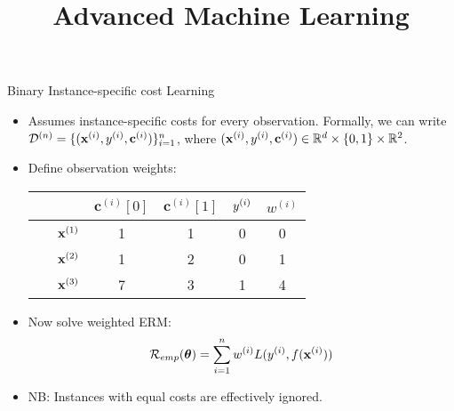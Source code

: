 \documentclass[11pt,compress,t,notes=noshow, xcolor=table]{beamer}
\title{Advanced Machine Learning}
\date{}
\newcommand{\cv}{\mathbf{c}}    %
\begin{document}



\sloppy





\begin{vbframe}{Binary Instance-specific cost Learning}
    \footnotesize
    \begin{itemize}
        \footnotesize
        \item Assumes instance-specific costs for every observation. Formally, we can write $\D^{(n)} = \{(\xi, \yi, \cv^{(i)})\}_{i=1}^n$, where $(\xi, \yi, \cv^{(i)}) \in \mathbb{R}^d \times \{0,1\} \times \mathbb{R}^2$.
        
        \item Define observation weights: 

        \begin{center}
                            \begin{tabular}{cc|cccc}\
        			& & $\cv^{(i)}[0]$ & $\cv^{(i)}[1]$ & $y^{(i)}$ & $w^{(i)}$ \\
        			\hline & $\mathbf{x}^{(1)}$ & 1 & 1 & 0 & 0\\
        			& $\mathbf{x}^{(2)}$ & 1 & 2 & 0 & 1\\
        			& $\mathbf{x}^{(3)}$ & 7 & 3 & 1 & 4\\

                \end{tabular}
        \end{center}
        \item Now solve weighted ERM:
        \begin{equation*}
            \mathcal{R}_{emp}(\boldsymbol{\theta}) = \sum_{i=1}^{n}w^{(i)}L(y^{(i)},f(\mathbf{x}^{(i)}))
        \end{equation*}
        \item NB: Instances with equal costs are effectively ignored.
        \end{itemize}
            
\end{vbframe}
\end{document}
